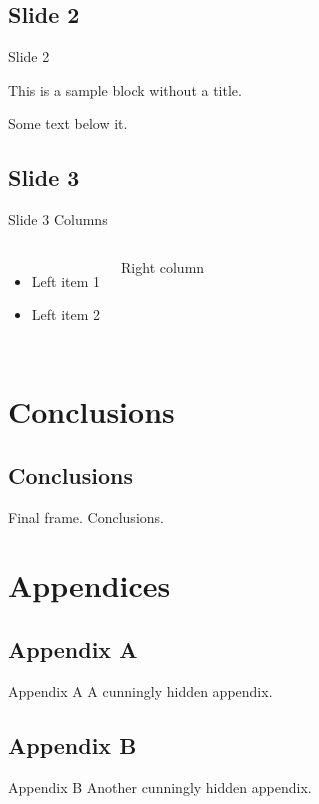 \documentclass[compress,ignorenonframetext]{beamer}
\begin{document}
\subsection{Slide 2}
\begin{frame}{Slide 2}
\begin{block}{}
This is a sample block without a title.
\end{block}
Some text below it.
\end{frame}

\subsection{Slide 3}
\begin{frame}{Slide 3}
Columns
\begin{columns}
\begin{itemize}
\item Left item 1
\item Left item 2
\end{itemize}
Right column
\end{columns}
\end{frame}

\section{Conclusions}
\subsection{Conclusions}
\begin{frame}
Final frame. Conclusions.
%
\setcounter{finalframe}{\value{framenumber}}
\end{frame}

\appendix

\section{Appendices}
\subsection{Appendix A}
\begin{frame}[noframenumbering]{Appendix A}
A cunningly hidden appendix.
\end{frame}


\subsection{Appendix B}
\begin{frame}[noframenumbering]{Appendix B}
%
Another cunningly hidden appendix.
%
\setcounter{framenumber}{\value{finalframe}} %
\end{frame}
\end{document}
